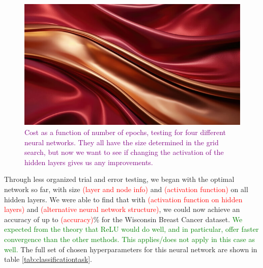 \begin{figure}
    \centering
    \includegraphics[width=0.5\linewidth]{figures/placeholders/activationfunctions_cost.png}
    \caption{\textcolor{purple}{Cost as a function of number of epochs, testing for four different neural networks. They all have the size determined in the grid search, but now we want to see if changing the activation of the hidden layers gives us any improvements.}}
    \label{fig:activationfunctions_cost}
\end{figure}

Through less organized trial and error testing, we began with the optimal network so far, with size \textcolor{red}{(layer and node info)} and \textcolor{red}{(activation function)} on all hidden layers. We were able to find that with \textcolor{red}{(activation function on hidden layers)} and \textcolor{red}{(alternative neural network structure)}, we could now achieve an accuracy of up to \textcolor{red}{(accuracy)}\% for the Wisconsin Breast Cancer dataset. \textcolor{green}{We expected from the theory that ReLU would do well, and in particular, offer faster convergence than the other methods. This applies/does not apply in this case as well.} The full set of chosen hyperparameters for this neural network are shown in table \ref{tab:classificationtask}.

